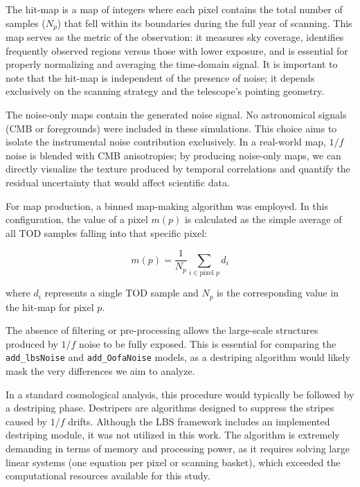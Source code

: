 The hit-map is a map of integers where each pixel contains the total number of samples ($N_p$) that fell within its boundaries during the full year of scanning. This map serves as the metric of the observation: it measures sky coverage, identifies frequently observed regions versus those with lower exposure, and is essential for properly normalizing and averaging the time-domain signal. It is important to note that the hit-map is independent of the presence of noise; it depends exclusively on the scanning strategy and the telescope's pointing geometry.

The noise-only maps contain the generated noise signal. No astronomical signals (CMB or foregrounds) were included in these simulations. This choice aims to isolate the instrumental noise contribution exclusively. In a real-world map, $1/f$ noise is blended with CMB anisotropies; by producing noise-only maps, we can directly visualize the texture produced by temporal correlations and quantify the residual uncertainty that would affect scientific data.

For map production, a binned map-making algorithm was employed. In this configuration, the value of a pixel $m(p)$ is calculated as the simple average of all TOD samples falling into that specific pixel:

\begin{equation}
m(p) = \frac{1}{N_p} \sum_{i \in \text{pixel } p} d_i
\end{equation}

where $d_i$ represents a single TOD sample and $N_p$ is the corresponding value in the hit-map for pixel $p$.

The absence of filtering or pre-processing allows the large-scale structures produced by $1/f$ noise to be fully exposed. This is essential for comparing the \texttt{add\_lbsNoise} and \texttt{add\_OofaNoise} models, as a destriping algorithm would likely mask the very differences we aim to analyze.

In a standard cosmological analysis, this procedure would typically be followed by a destriping phase. Destripers are algorithms designed to suppress the stripes caused by $1/f$ drifts. Although the LBS framework includes an implemented destriping module, it was not utilized in this work. The algorithm is extremely demanding in terms of memory and processing power, as it requires solving large linear systems (one equation per pixel or scanning basket), which exceeded the computational resources available for this study.

